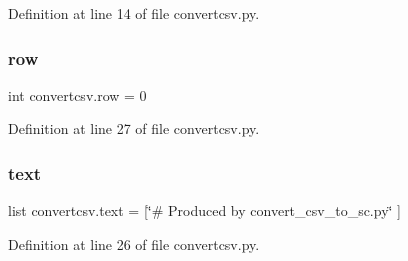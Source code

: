 Definition at line 14 of file convertcsv.\+py.

\mbox{\label{namespaceconvertcsv_a1430f2e5c5ba8eefdbe15f1243042c6f}} 
\subsubsection{row}
{\footnotesize\ttfamily int convertcsv.\+row = 0}



Definition at line 27 of file convertcsv.\+py.

\mbox{\label{namespaceconvertcsv_a7bcc3df45189c33b16ca2ba182184bb5}} 
\subsubsection{text}
{\footnotesize\ttfamily list convertcsv.\+text = [\char`\"{}\# Produced by convert\+\_\+csv\+\_\+to\+\_\+sc.\+py\char`\"{} ]}



Definition at line 26 of file convertcsv.\+py.

